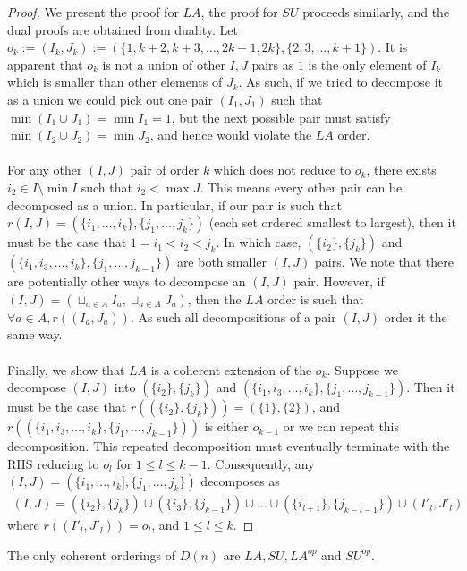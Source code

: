 \begin{proof}
We present the proof for ${LA}$, the proof for ${SU}$ proceeds similarly, and the dual proofs are obtained from duality.
Let $o_k:= (I_k,J_k):= (\{1,k+2,k+3,\dots,2k-1,2k\}, \{2,3,\dots,k+1\})$. It is apparent that $o_k$ is not a union of other $I,J$ pairs as $1$ is the only element of $I_k$ which is smaller than other elements of $J_k$.
As such, if we tried to decompose it as a union we could pick out one pair $(I_1,J_1)$ such that $\min ( I_1\cup J_1) = \min I_1 = 1$, but the next possible pair must satisfy $\min ( I_2\cup J_2) = \min J_2$, and hence would violate the $LA$ order.
\\\\
For any other $(I,J)$ pair of order $k$ which does not reduce to $o_k$, there exists $i_2 \in I\setminus \min I$ such that $i_2 < \max J$.
This means every other pair can be decomposed as a union. In particular, if our pair is such that $r(I,J)=(\{i_1,\dots,i_k\},\{j_1,\dots,j_k\})$ (each set ordered smallest to largest), then it must be the case that $1=i_1<i_2<j_k$.
In which case, $(\{i_2\},\{j_k\})$ and $(\{i_1,i_3,\dots,i_k\},\{j_1,\dots,j_{k-1}\})$ are both smaller $(I,J)$ pairs.
We note that there are potentially other ways to decompose an $(I,J)$ pair. 
However, if $(I,J) = (\sqcup_{a\in A} I_a, \sqcup_{a \in A} J_a)$, then the ${LA}$ order is such that $\forall a \in A, r((I_a, J_a))$.
As such all decompositions of a pair $(I,J)$ order it the same way.
\\\\
Finally, we show that $LA$ is a coherent extension of the $o_k$.
Suppose we decompose $(I,J)$ into $(\{i_2\},\{j_k\})$ and $(\{i_1,i_3,\dots,i_k\},\{j_1,\dots,j_{k-1}\})$.
Then it must be the case that $r((\{i_2\},\{j_k\})) = (\{1\},\{2\})$, and $r((\{i_1,i_3,\dots,i_k\},\{j_1,\dots,j_{k-1}\}))$ is either $o_{k-1}$ or we can repeat this decomposition.
This repeated decomposition must eventually terminate with the RHS reducing to $o_{l}$ for $1 \leq l \leq k-1$.
Consequently, any $(I,J) = (\{i_1,...,i_k], \{j_1,...,j_k\})$ decomposes as
\begin{align*}
	(I,J) = (\{i_2\},\{j_k\}) \cup (\{i_3\},\{j_{k-1}\}) \cup ... \cup (\{i_{l+1} \},\{j_{k-l-1} \}) \cup (I'_l,J'_l)
\end{align*}
where $r((I'_l,J'_l)) = o_l$, and $1\leq l \leq k$.
\end{proof}

\begin{lemma}
The only coherent orderings of $D(n)$ are $LA,SU,LA^{op}$ and $SU^{op}$.
\end{lemma}

